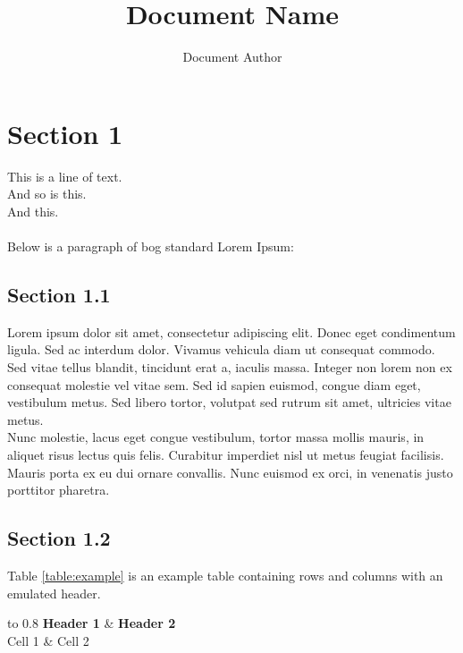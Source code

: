 \documentclass[a4paper]{article}
\title{Document Name}
\author{Document Author}
\begin{document}
    \maketitle
    \newpage
    \tableofcontents
    \listoffigures
    \listoftables
    \newpage
    \section{Section 1}
        This is a line of text.\\
        And so is this.\\
        And this.\\
        \\
        Below is a paragraph of bog standard Lorem Ipsum:\\
        \subsection{Section 1.1}
            Lorem ipsum dolor sit amet, consectetur adipiscing elit. Donec eget condimentum ligula. Sed ac interdum dolor. Vivamus vehicula diam ut consequat commodo. Sed vitae tellus blandit, tincidunt erat a, iaculis massa. Integer non lorem non ex consequat molestie vel vitae sem. Sed id sapien euismod, congue diam eget, vestibulum metus. Sed libero tortor, volutpat sed rutrum sit amet, ultricies vitae metus.\\
            Nunc molestie, lacus eget congue vestibulum, tortor massa mollis mauris, in aliquet risus lectus quis felis. Curabitur imperdiet nisl ut metus feugiat facilisis. Mauris porta ex eu dui ornare convallis. Nunc euismod ex orci, in venenatis justo porttitor pharetra.
        \subsection{Section 1.2}
            Table \ref{table:example} is an example table containing rows and columns with an emulated header.
            \begin{center}
                \begin{table}[h] %
                    \begin{tabu} to 0.8\textwidth { | X[l] | X[l] | }
                        \hline
                        \textbf{Header 1} & \textbf{Header 2}\\
                        \hline
                        Cell 1 & Cell 2\\
                        \hline
                    \end{tabu}
                    \caption{Example table using the tabu package.}
                    \label{table:example}
                \end{table}
            \end{center}
\end{document}
